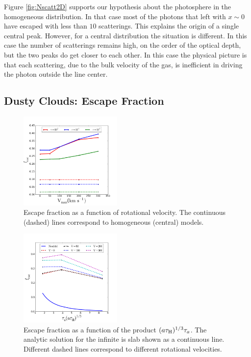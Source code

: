 \documentclass{emulateapj}
\begin{document}
Figure \ref{fig:Nscatt2D} supports our hypothesis about
the photosphere in the homogeneous distribution. In that case most of
the photons that left with $x\sim 0$ have escaped with less than $10$
scatterings. This explains the origin of a single central
peak. However, for a central distribution the situation is
different. In this case the number of scatterings remains high, on the
order of the optical depth, but the two peaks do get closer to each
other. In this case the physical picture is that each scattering, due
to the bulk velocity of the gas, is inefficient in driving the photon
outside the line center. 


\subsection{Dusty Clouds: Escape Fraction}
\label{sec:escapefraction}


\begin{figure}
  \includegraphics[width=0.45\textwidth]{escapefraction.png}
   \caption{Escape fraction as a function of rotational velocity. The
     continuous (dashed) lines correspond to homogeneous (central)
     models.
     \label{fig:efvsv}}
\end{figure}


\begin{figure}
  \includegraphics[width=0.45\textwidth]{Neufeld.png}
 \caption{Escape fraction as a function of the
   product $(a\tau_{\rm H})^{1/3}\tau_{a}$. The analytic solution for
   the infinite is slab shown as a continuous line. Different dashed
   lines correspond to different rotational velocities.
   \label{fig:efvsNeufeld}}   
\end{figure}
\end{document}
